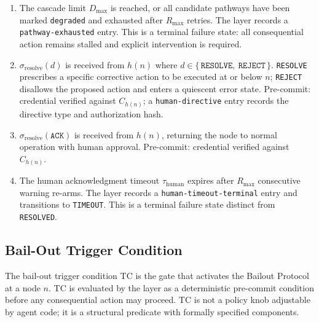 \begin{enumerate}
\item[\textbf{T7 (ESCALATING $\rightarrow$ PATHWAY\_EXHAUSTED):}] The cascade limit $D_{\max}$ is reached, or all candidate pathways have been marked \texttt{degraded} and exhausted after $R_{\max}$ retries. The \fact{} layer records a \texttt{pathway-exhausted} entry. This is a terminal failure state: all consequential action remains stalled and explicit intervention is required.

\item[\textbf{T8 (HUMAN\_ACKNOWLEDGED $\rightarrow$ RESOLVED):}] $\sigma_{\text{resolve}}(d)$ is received from $h(n)$ where $d \in \{\,\texttt{RESOLVE},\ \texttt{REJECT}\,\}$. \texttt{RESOLVE} prescribes a specific corrective action to be executed at or below $n$; \texttt{REJECT} disallows the proposed action and enters a quiescent error state. Pre-commit: credential verified against $C_{h(n)}$; a \texttt{human-directive} entry records the directive type and authorization hash.

\item[\textbf{T9 (HUMAN\_ACKNOWLEDGED $\rightarrow$ IDLE):}] $\sigma_{\text{resolve}}(\texttt{ACK})$ is received from $h(n)$, returning the node to normal operation with human approval. Pre-commit: credential verified against $C_{h(n)}$.

\item[\textbf{T10 (HUMAN\_ACKNOWLEDGED $\rightarrow$ TIMEOUT):}] The human acknowledgment timeout $\tau_{\text{human}}$ expires after $R_{\max}$ consecutive warning re-arms. The \fact{} layer records a \texttt{human-timeout-terminal} entry and transitions to \texttt{TIMEOUT}. This is a terminal failure state distinct from \texttt{RESOLVED}.
\end{enumerate}

\subsection{Bail-Out Trigger Condition}
\label{sec:bp-trigger}

The bail-out trigger condition TC is the gate that activates the Bailout Protocol at a node $n$. TC is evaluated by the \fact{} layer as a deterministic pre-commit condition before any consequential action may proceed. TC is not a policy knob adjustable by agent code; it is a structural predicate with formally specified components.

